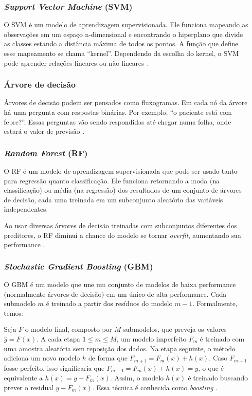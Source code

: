 \documentclass[a4paper,titlepage]{ppgi}\usepackage[]{graphicx}\usepackage[]{color}
\begin{document}
\subsubsection{\emph{Support Vector Machine} (SVM)}

O \gls{SVM} é um modelo de aprendizagem supervisionada. Ele funciona mapeando
as observações em um espaço n-dimensional e encontrando o hiperplano que divide
as classes estando a distância máxima de todos os pontos. A função que define
esse mapeamento se chama ``kernel''. Dependendo da escolha do kernel, o
\gls{SVM} pode aprender relações lineares ou não-lineares \cite{Kuhn2013}.

\subsubsection{Árvore de decisão}

Árvores de decisão podem ser pensados como fluxogramas. Em cada nó da árvore há
uma pergunta com respostas binárias. Por exemplo, ``o paciente está com
febre?''. Essas perguntas vão sendo respondidas até chegar numa folha, onde
estará o valor de previsão \cite{Kuhn2013}.

\subsubsection{\emph{Random Forest} (RF)}

O \gls{RF} é um modelo de aprendizagem supervisionada que pode ser usado tanto
para regressão quanto classificação. Ele funciona retornando a moda (na
classificação) ou média (na regressão) dos resultados de um conjunto de
árvores de decisão, cada uma treinada em um subconjunto aleatório das variáveis
independentes.

Ao usar diversas árvores de decisão treinadas com subconjuntos diferentes dos
preditores, o \gls{RF} diminui a chance do modelo se tornar \emph{overfit},
aumentando sua performance \cite{Kuhn2013}.

\subsubsection{\emph{Stochastic Gradient Boosting} (GBM)}

O \gls{GBM} é um modelo que une um conjunto de modelos de baixa performance
(normalmente árvores de decisão) em um único de alta performance. Cada
submodelo $m$ é treinado a partir dos resíduos do modelo $m - 1$. Formalmente,
temos:

Seja $F$ o modelo final, composto por $M$ submodelos, que preveja os valores
$\hat{y} = F(x)$. A cada etapa $1 \le m \le M$, um modelo imperfeito $F_m$ é
treinado com uma amostra aleatória sem reposição dos dados. Na etapa seguinte,
o método adiciona um novo modelo $h$ de forma que $F_{m + 1} = F_m(x) + h(x)$.
Caso $F_{m + 1}$ fosse perfeito, isso significaria que $F_{m + 1} = F_m(x) +
h(x) = y$, o que é equivalente a $h(x) = y - F_m(x)$. Assim, o modelo $h(x)$ é
treinado buscando prever o residual $y - F_m(x)$. Essa técnica é conhecida como
\emph{boosting} \cite{Kuhn2013}.
\end{document}
